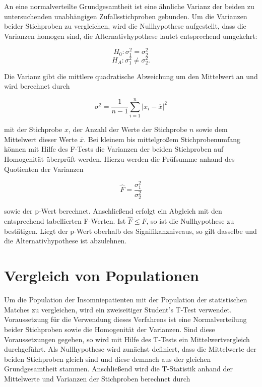 An eine normalverteilte Grundgesamtheit ist eine ähnliche Varianz der beiden zu untersuchenden unabhängigen Zufallsstichproben gebunden. Um die Varianzen beider Stichproben zu vergleichen, wird die Nullhypothese aufgestellt, dass die Varianzen homogen sind, die Alternativhypothese lautet entsprechend umgekehrt:

\begin{equation}
H_0: \sigma_{1}^2 = \sigma_{2}^2\nonumber
\end{equation}
\begin{equation}
H_A: \sigma_{1}^2 \neq \sigma_{2}^2.
	\label{eq:Ho_varianz}
\end{equation}

Die Varianz gibt die mittlere quadratische Abweichung um den Mittelwert an und wird berechnet durch

\begin{equation}
\sigma^2 = \frac{1}{n-1}\sum \limits_{i=1}^n |x_i - \overline{x}|^2
\end{equation}

mit der Stichprobe $x$, der Anzahl der Werte der Stichprobe $n$ sowie dem Mittelwert dieser Werte $\overline{x}$. Bei kleinem bis mittelgroßem Stichprobenumfang können mit Hilfe des F-Tests die Varianzen der beiden Stichproben auf Homogenität überprüft werden. Hierzu werden die Prüfsumme anhand des Quotienten der Varianzen

\begin{equation}
\hat{F} = \frac{\sigma_{1}^2}{\sigma_{2}^2}
\end{equation}

sowie der p-Wert berechnet. Anschließend erfolgt ein Abgleich mit den entsprechend tabellierten F-Werten. Ist $\hat{F}\leq F$, so ist die Nullhypothese zu bestätigen. Liegt der p-Wert oberhalb des Signifikanzniveaus, so gilt dasselbe und die Alternativhypothese ist abzulehnen. \parencite{hedderich_angewandte_2016}

\section{Vergleich von Populationen}

Um die Population der Insomniepatienten mit der Population der statistischen Matches zu vergleichen, wird ein zweiseitiger Student's T-Test verwendet. Voraussetzung für die Verwendung dieses Verfahrens ist eine Normalverteilung beider Stichproben sowie die Homogenität der Varianzen. Sind diese Voraussetzungen gegeben, so wird mit Hilfe des T-Tests ein Mittelwertvergleich durchgeführt. Als Nullhypothese wird zunächst definiert, dass die Mittelwerte der beiden Stichproben gleich sind und diese demnach aus der gleichen Grundgesamtheit stammen. Anschließend wird die T-Statistik anhand der Mittelwerte und Varianzen der Stichproben berechnet durch

